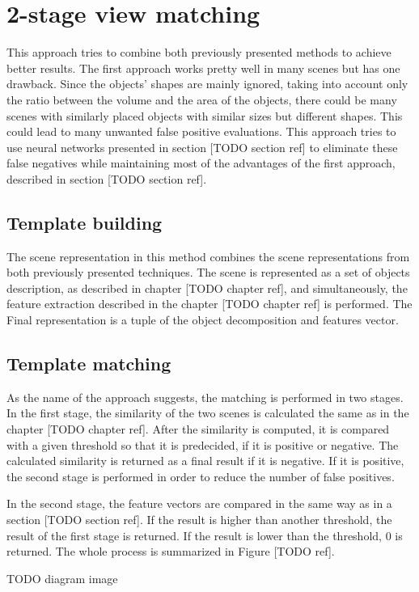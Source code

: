\section{2-stage view matching}

This approach tries to combine both previously presented methods to achieve better results. The first approach works pretty well in many scenes but has one drawback. Since the objects' shapes are mainly ignored, taking into account only the ratio between the volume and the area of the objects, there could be many scenes with similarly placed objects with similar sizes but different shapes. This could lead to many unwanted false positive evaluations. This approach tries to use neural networks presented in section [TODO section ref] to eliminate these false negatives while maintaining most of the advantages of the first approach, described in section [TODO section ref].\par

\subsection{Template building}

The scene representation in this method combines the scene representations from both previously presented techniques. The scene is represented as a set of objects description, as described in chapter [TODO chapter ref], and simultaneously, the feature extraction described in the chapter [TODO chapter ref] is performed. The Final representation is a tuple of the object decomposition and features vector.

\subsection{Template matching}

As the name of the approach suggests, the matching is performed in two stages. In the first stage, the similarity of the two scenes is calculated the same as in the chapter [TODO chapter ref]. After the similarity is computed, it is compared with a given threshold so that it is predecided, if it is positive or negative. The calculated similarity is returned as a final result if it is negative. If it is positive, the second stage is performed in order to reduce the number of false positives.\par
In the second stage, the feature vectors are compared in the same way as in a section [TODO section ref]. If the result is higher than another threshold, the result of the first stage is returned. If the result is lower than the threshold, 0 is returned. The whole process is summarized in Figure [TODO ref].

TODO diagram image
